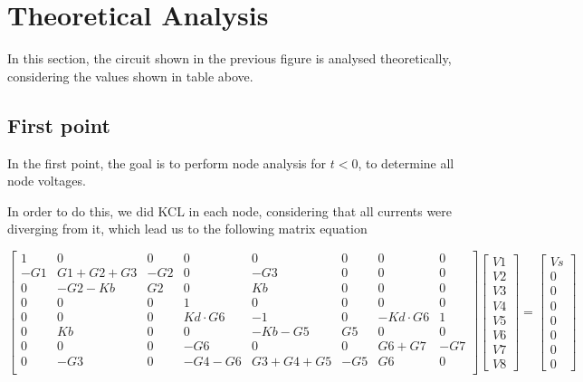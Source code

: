 \section{Theoretical Analysis}
\label{sec:theoretical}

\noindent \par In this section, the circuit shown in the previous figure is analysed theoretically, considering the values shown in table above.

\subsection{First point}
\label{ssec:1T}
\noindent \par In the first point, the goal is to perform node analysis for $t<0$, to determine all node voltages.
\par In order to do this, we did KCL in each node, considering that all currents were diverging from it, which lead us to the following matrix equation

\begin{equation}
\label{eq:teo1}
	\begin{bmatrix}
	1 & 0 & 0 & 0 & 0 & 0 & 0 & 0 \\ -G1 & G1+G2+G3 & -G2 & 0 & -G3 & 0 & 0 & 0 \\ 0 & -G2-Kb & G2 & 0 & Kb & 0 & 0 & 0 \\ 0 & 0 & 0 & 1 & 0 & 0 & 0 & 0 \\ 0 & 0 & 0 & Kd \cdot G6 & -1 & 0 & -Kd 		\cdot G6 & 1 \\ 0 & Kb & 0 & 0 & -Kb-G5 & G5 & 0 & 0 \\ 0 & 0 & 0 & -G6 & 0 & 0 & G6+G7 & -G7 \\ 0 & -G3 & 0 & -G4-G6 & G3+G4+G5 & -G5 & G6 & 0 \\
	\end{bmatrix}
	\begin{bmatrix}
	V1 \\ V2 \\ V3 \\ V4 \\ V5 \\ V6 \\ V7 \\ V8
	\end{bmatrix}
	=
	\begin{bmatrix}
	Vs \\ 0 \\ 0 \\ 0 \\ 0 \\ 0 \\ 0 \\ 0
	\end{bmatrix}
\end{equation}

